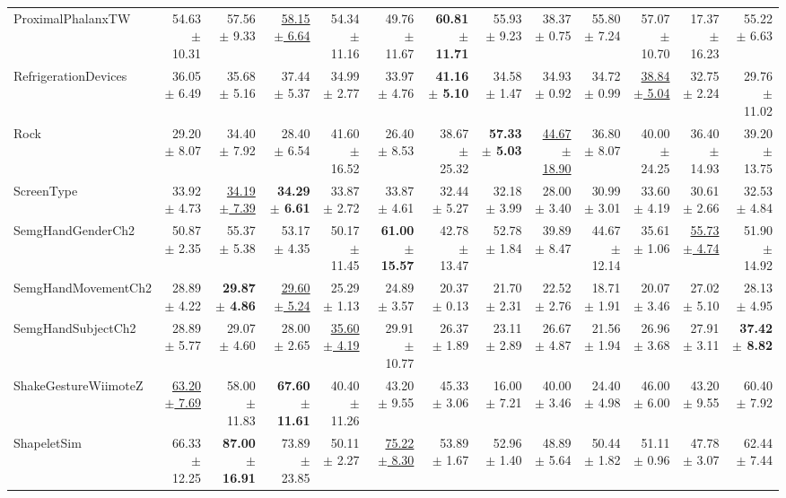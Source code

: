 \begin{landscape}
\begin{longtable}{lrrrrrrrrrrrr}
ProximalPhalanxTW & 54.63 $\pm$ 10.31 & 57.56 $\pm$ 9.33 & \underline{58.15 $\pm$ 6.64} & 54.34 $\pm$ 11.16 & 49.76 $\pm$ 11.67 & \textbf{60.81 $\pm$ 11.71} & 55.93 $\pm$ 9.23 & 38.37 $\pm$ 0.75 & 55.80 $\pm$ 7.24 & 57.07 $\pm$ 10.70 & 17.37 $\pm$ 16.23 & 55.22 $\pm$ 6.63 \\
RefrigerationDevices & 36.05 $\pm$ 6.49 & 35.68 $\pm$ 5.16 & 37.44 $\pm$ 5.37 & 34.99 $\pm$ 2.77 & 33.97 $\pm$ 4.76 & \textbf{41.16 $\pm$ 5.10} & 34.58 $\pm$ 1.47 & 34.93 $\pm$ 0.92 & 34.72 $\pm$ 0.99 & \underline{38.84 $\pm$ 5.04} & 32.75 $\pm$ 2.24 & 29.76 $\pm$ 11.02 \\
Rock & 29.20 $\pm$ 8.07 & 34.40 $\pm$ 7.92 & 28.40 $\pm$ 6.54 & 41.60 $\pm$ 16.52 & 26.40 $\pm$ 8.53 & 38.67 $\pm$ 25.32 & \textbf{57.33 $\pm$ 5.03} & \underline{44.67 $\pm$ 18.90} & 36.80 $\pm$ 8.07 & 40.00 $\pm$ 24.25 & 36.40 $\pm$ 14.93 & 39.20 $\pm$ 13.75 \\
ScreenType & 33.92 $\pm$ 4.73 & \underline{34.19 $\pm$ 7.39} & \textbf{34.29 $\pm$ 6.61} & 33.87 $\pm$ 2.72 & 33.87 $\pm$ 4.61 & 32.44 $\pm$ 5.27 & 32.18 $\pm$ 3.99 & 28.00 $\pm$ 3.40 & 30.99 $\pm$ 3.01 & 33.60 $\pm$ 4.19 & 30.61 $\pm$ 2.66 & 32.53 $\pm$ 4.84 \\
SemgHandGenderCh2 & 50.87 $\pm$ 2.35 & 55.37 $\pm$ 5.38 & 53.17 $\pm$ 4.35 & 50.17 $\pm$ 11.45 & \textbf{61.00 $\pm$ 15.57} & 42.78 $\pm$ 13.47 & 52.78 $\pm$ 1.84 & 39.89 $\pm$ 8.47 & 44.67 $\pm$ 12.14 & 35.61 $\pm$ 1.06 & \underline{55.73 $\pm$ 4.74} & 51.90 $\pm$ 14.92 \\
SemgHandMovementCh2 & 28.89 $\pm$ 4.22 & \textbf{29.87 $\pm$ 4.86} & \underline{29.60 $\pm$ 5.24} & 25.29 $\pm$ 1.13 & 24.89 $\pm$ 3.57 & 20.37 $\pm$ 0.13 & 21.70 $\pm$ 2.31 & 22.52 $\pm$ 2.76 & 18.71 $\pm$ 1.91 & 20.07 $\pm$ 3.46 & 27.02 $\pm$ 5.10 & 28.13 $\pm$ 4.95 \\
SemgHandSubjectCh2 & 28.89 $\pm$ 5.77 & 29.07 $\pm$ 4.60 & 28.00 $\pm$ 2.65 & \underline{35.60 $\pm$ 4.19} & 29.91 $\pm$ 10.77 & 26.37 $\pm$ 1.89 & 23.11 $\pm$ 2.89 & 26.67 $\pm$ 4.87 & 21.56 $\pm$ 1.94 & 26.96 $\pm$ 3.68 & 27.91 $\pm$ 3.11 & \textbf{37.42 $\pm$ 8.82} \\
ShakeGestureWiimoteZ & \underline{63.20 $\pm$ 7.69} & 58.00 $\pm$ 11.83 & \textbf{67.60 $\pm$ 11.61} & 40.40 $\pm$ 11.26 & 43.20 $\pm$ 9.55 & 45.33 $\pm$ 3.06 & 16.00 $\pm$ 7.21 & 40.00 $\pm$ 3.46 & 24.40 $\pm$ 4.98 & 46.00 $\pm$ 6.00 & 43.20 $\pm$ 9.55 & 60.40 $\pm$ 7.92 \\
ShapeletSim & 66.33 $\pm$ 12.25 & \textbf{87.00 $\pm$ 16.91} & 73.89 $\pm$ 23.85 & 50.11 $\pm$ 2.27 & \underline{75.22 $\pm$ 8.30} & 53.89 $\pm$ 1.67 & 52.96 $\pm$ 1.40 & 48.89 $\pm$ 5.64 & 50.44 $\pm$ 1.82 & 51.11 $\pm$ 0.96 & 47.78 $\pm$ 3.07 & 62.44 $\pm$ 7.44 \\

\end{longtable}
\end{landscape}

